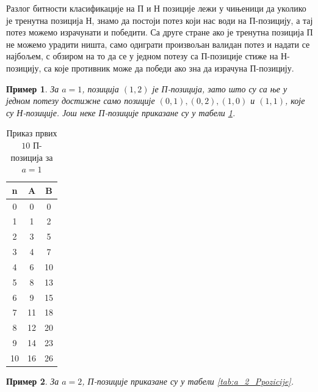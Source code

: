 \documentclass[a4paper]{article}
\newtheorem{example}{Пример}
\begin{document}
Разлог битности класификације на П и Н позиције лежи у чињеници да уколико је тренутна позиција Н, знамо да постоји потез који нас води на П-позицију, а тај потез можемо израчунати и победити. Са друге стране ако је тренутна позиција П не можемо урадити ништа, само одиграти произвољан валидан потез и надати се најбољем, с обзиром на то да се у једном потезу са П-позиције стиже на Н-позицију, са које противник може да победи ако зна да израчуна П-позицију. 

\begin{example}
	За $ a = 1 $, позиција $ (1, 2) $ је П-позиција, зато што су са ње у једном потезу достижне само позиције $ (0, 1), (0, 2), (1, 0) $ и $ (1, 1) $, које су Н-позиције. Још неке П-позиције приказане су у табели \ref{tab:a_1_Ppozicije}. 
\end{example}

\begin{table}[h!]
	\caption{Приказ првих $ 10 $ П-позиција за $ a = 1 $}
	\label{tab:a_1_Ppozicije}
	\begin{center}
		\begin{tabular}{  c | c | c }
			{\textbf{n}} &  {\textbf{A}} &  {\textbf{B}} \\
			\hline
			0 & 0 & 0 \\
			1 & 1 & 2 \\
			2 & 3 & 5 \\
			3 & 4 & 7 \\
			4 & 6 & 10 \\
			5 & 8 & 13 \\
			6 & 9 & 15 \\
			7 & 11 & 18 \\
			8 & 12 & 20 \\
			9 & 14 & 23 \\
			10 & 16 & 26\\ 
		\end{tabular}
	\end{center}
\end{table}

\begin{example}
	За $ a = 2 $, П-позиције приказане су у табели \ref{tab:a_2_Ppozicije}.
\end{example}
\end{document}
